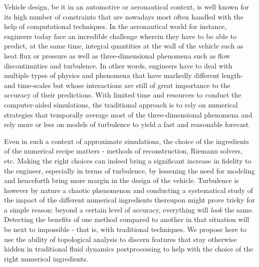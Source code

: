 Vehicle design, be it in an automotive or aeronautical context, is well known for its high number of constraints that are nowadays most often handled with the help of computational techniques.
In the aeronautical world for instance, engineers today face an incredible challenge wherein they have to be able to predict, at the same time, integral quantities at the wall of the vehicle such as heat flux or pressure as well as three-dimensional phenomena such as flow discontinuities and turbulence.
In other words, engineers have to deal with multiple types of physics and phenomena that have markedly different length- and time-scales but whose interactions are still of great importance to the accuracy of their predictions.
With limited time and resources to conduct the computer-aided simulations, the traditional approach is to rely on numerical strategies that temporally average most of the three-dimensional phenomena and rely more or less on models of turbulence to yield a fast and reasonable forecast.

Even in such a context of approximate simulations, the choice of the ingredients of the numerical recipe matters - methods of reconstruction, Riemann solvers, etc.
Making the right choices can indeed bring a significant increase in fidelity to the engineer, especially in terms of turbulence, by lessening the need for modeling and henceforth bring more margin in the design of the vehicle.
Turbulence is however by nature a chaotic phenomenon and conducting a systematical study of the impact of the different
numerical ingredients thereupon might prove tricky for a simple reason: beyond a certain level of accuracy, everything will \emph{look} the same.
Detecting the benefits of one method compared to another in that situation will be next to impossible - that is, with traditional techniques.
We propose here to use the ability of topological analysis to discern features that stay otherwise hidden in traditional fluid dynamics postprocessing to help with the choice of the right numerical ingredients. 



